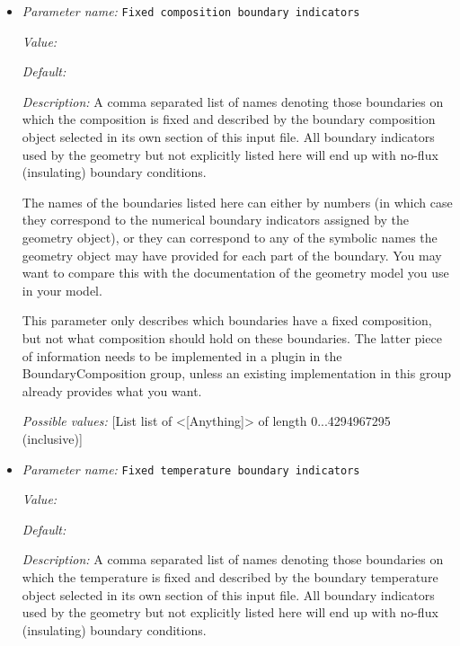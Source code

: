 \begin{itemize}
\item {\it Parameter name:} {\tt Fixed composition boundary indicators}
\label{parameters:Model settings/Fixed composition boundary indicators}


{\it Value:} 


{\it Default:} 


{\it Description:} A comma separated list of names denoting those boundaries on which the composition is fixed and described by the boundary composition object selected in its own section of this input file. All boundary indicators used by the geometry but not explicitly listed here will end up with no-flux (insulating) boundary conditions.

The names of the boundaries listed here can either by numbers (in which case they correspond to the numerical boundary indicators assigned by the geometry object), or they can correspond to any of the symbolic names the geometry object may have provided for each part of the boundary. You may want to compare this with the documentation of the geometry model you use in your model.

This parameter only describes which boundaries have a fixed composition, but not what composition should hold on these boundaries. The latter piece of information needs to be implemented in a plugin in the BoundaryComposition group, unless an existing implementation in this group already provides what you want.


{\it Possible values:} [List list of <[Anything]> of length 0...4294967295 (inclusive)]
\item {\it Parameter name:} {\tt Fixed temperature boundary indicators}
\label{parameters:Model settings/Fixed temperature boundary indicators}


{\it Value:} 


{\it Default:} 


{\it Description:} A comma separated list of names denoting those boundaries on which the temperature is fixed and described by the boundary temperature object selected in its own section of this input file. All boundary indicators used by the geometry but not explicitly listed here will end up with no-flux (insulating) boundary conditions.


\end{itemize}
